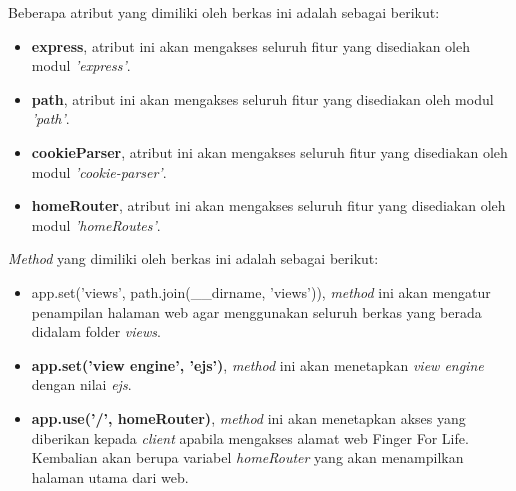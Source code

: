 \begin{enumerate}
	Beberapa atribut yang dimiliki oleh berkas ini adalah sebagai berikut:
	\begin{itemize}
		\item \textbf{express}, atribut ini akan mengakses seluruh fitur yang disediakan oleh modul \textit{'express'}.
		
		\item \textbf{path}, atribut ini akan mengakses seluruh fitur yang disediakan oleh modul \textit{'path'}.
		
		\item \textbf{cookieParser}, atribut ini akan mengakses seluruh fitur yang disediakan oleh modul \textit{'cookie-parser'}.
		
		\item \textbf{homeRouter}, atribut ini akan mengakses seluruh fitur yang disediakan oleh modul \textit{'homeRoutes'}.
	\end{itemize}
	
	\textit{Method} yang dimiliki oleh berkas ini adalah sebagai berikut:
	\begin{itemize}
		\item app.set('views', path.join(\_\_dirname, 'views')), \textit{method} ini akan mengatur penampilan halaman web agar menggunakan seluruh berkas yang berada didalam folder \textit{views}.
		
		\item \textbf{app.set('view engine', 'ejs')}, \textit{method} ini akan menetapkan \textit{view engine} dengan nilai \textit{ejs}.
		
		\item \textbf{app.use('/', homeRouter)}, \textit{method} ini akan menetapkan akses yang diberikan kepada \textit{client} apabila mengakses alamat web Finger For Life. Kembalian akan berupa variabel \textit{homeRouter} yang akan menampilkan halaman utama dari web.
	\end{itemize}
	
	
	
\end{enumerate}